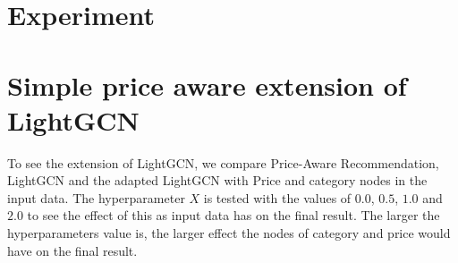 \section{Experiment}

\section{Simple price aware extension of LightGCN}
To see the extension of LightGCN, we compare Price-Aware Recommendation, LightGCN and the adapted LightGCN with Price and category nodes in the input data. 
The hyperparameter $X$ is tested with the values of $0.0$, $0.5$, $1.0$ and $2.0$ to see the effect of this as input data has on the final result.
The larger the hyperparameters value is, the larger effect the nodes of category and price would have on the final result.
